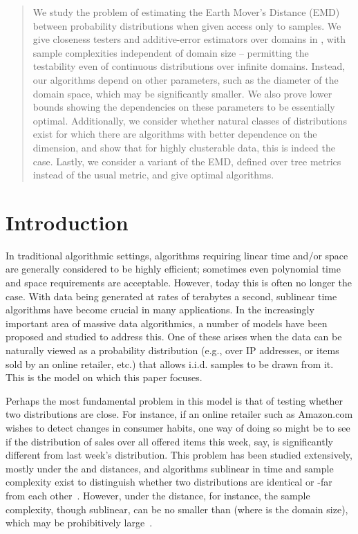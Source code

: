\documentclass[11pt]{article}
\begin{document}
\begin{abstract}
	We study the problem of estimating the Earth Mover's Distance (EMD) between
	probability distributions when given access only to samples. We give closeness
	testers and additive-error estimators over domains in , with
	sample complexities independent of domain size -- permitting the testability
	even of continuous distributions over infinite domains. Instead, our algorithms depend on
	other parameters, such as the diameter of the domain space, which may be
	significantly smaller. We also prove lower bounds showing the dependencies
	on these parameters to be essentially optimal. Additionally, we consider whether
	natural classes of distributions exist for which there are
	algorithms with better dependence on the dimension, and show that for
	highly clusterable data, this is indeed the case. Lastly, we consider a variant
	of the EMD, defined over tree metrics instead of the usual  metric, and
	give optimal algorithms.
\end{abstract}
\section{Introduction}

In traditional algorithmic settings, algorithms requiring linear time and/or space
are generally considered to be highly efficient; sometimes even
polynomial time and space requirements are acceptable. However, today this is often no
longer the case. With data being generated at rates of terabytes a second,
sublinear time algorithms have become crucial in many applications. In the increasingly important
area of massive data algorithmics, a number of models have been proposed and
studied to address this. One of these arises when the data can be naturally viewed
as a probability distribution (e.g., over IP addresses, or items sold by an online
retailer, etc.) that allows i.i.d. samples to be drawn from it. This is the model
on which this paper focuses.

Perhaps the most fundamental problem in this model is that of testing whether two
distributions are close. For instance, if an online retailer such as Amazon.com
wishes to detect changes in consumer habits, one way of doing so might be to see if
the distribution of sales over all offered items this week, say, is significantly
different from last week's distribution. This problem has been studied extensively, mostly
under the  and  distances, and algorithms sublinear in time and
sample complexity exist to distinguish
whether two distributions are identical or -far from each other~\cite{L1tester,GR,valiant}.
However, under the  distance, for instance, the sample complexity, though sublinear, can be no
smaller than  (where  is the domain size), which may be
prohibitively large~\cite{L1tester,valiant}.
\end{document}
